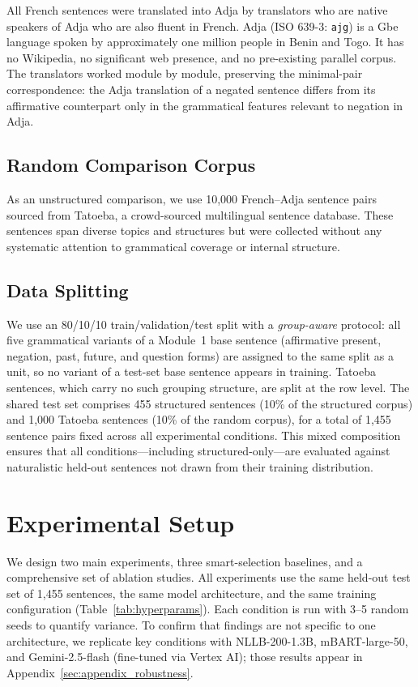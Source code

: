 \documentclass[11pt]{article}
\begin{document}
All French sentences were translated into Adja by translators who are native speakers of Adja who are also fluent in French. Adja (ISO 639-3: \texttt{ajg}) is a Gbe language spoken by approximately one million people in Benin and Togo. It has no Wikipedia, no significant web presence, and no pre-existing parallel corpus. The translators worked module by module, preserving the minimal-pair correspondence: the Adja translation of a negated sentence differs from its affirmative counterpart only in the grammatical features relevant to negation in Adja.

\subsection{Random Comparison Corpus}

As an unstructured comparison, we use 10,000 French--Adja sentence pairs sourced from Tatoeba, a crowd-sourced multilingual sentence database. These sentences span diverse topics and structures but were collected without any systematic attention to grammatical coverage or internal structure.

\subsection{Data Splitting}
\label{sec:splitting}

We use an 80/10/10 train/validation/test split with a \emph{group-aware} protocol: all five grammatical variants of a Module~1 base sentence (affirmative present, negation, past, future, and question forms) are assigned to the same split as a unit, so no variant of a test-set base sentence appears in training. Tatoeba sentences, which carry no such grouping structure, are split at the row level. The shared test set comprises 455 structured sentences (10\% of the structured corpus) and 1,000 Tatoeba sentences (10\% of the random corpus), for a total of 1,455 sentence pairs fixed across all experimental conditions. This mixed composition ensures that all conditions---including structured-only---are evaluated against naturalistic held-out sentences not drawn from their training distribution.


\section{Experimental Setup}
\label{sec:experiments}

We design two main experiments, three smart-selection baselines, and a comprehensive set of ablation studies. All experiments use the same held-out test set of 1,455 sentences, the same model architecture, and the same training configuration (Table~\ref{tab:hyperparams}). Each condition is run with 3--5 random seeds to quantify variance. To confirm that findings are not specific to one architecture, we replicate key conditions with NLLB-200-1.3B, mBART-large-50, and Gemini-2.5-flash (fine-tuned via Vertex AI); those results appear in Appendix~\ref{sec:appendix_robustness}.
\end{document}
